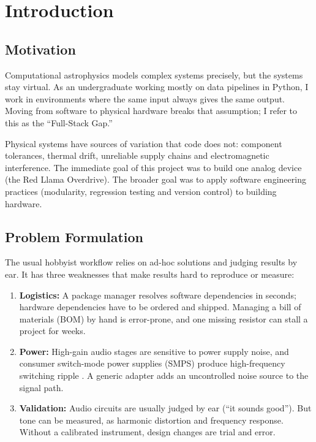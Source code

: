 \documentclass[11pt, a4paper]{report}
\begin{document}
\chapter{Introduction}

\section{Motivation}
Computational astrophysics models complex systems precisely, but the systems stay virtual. As an undergraduate working mostly on data pipelines in Python, I work in environments where the same input always gives the same output. Moving from software to physical hardware breaks that assumption; I refer to this as the ``Full-Stack Gap.''

Physical systems have sources of variation that code does not: component tolerances, thermal drift, unreliable supply chains and electromagnetic interference. The immediate goal of this project was to build one analog device (the Red Llama Overdrive). The broader goal was to apply software engineering practices (modularity, regression testing and version control) to building hardware.

\section{Problem Formulation}
The usual hobbyist workflow relies on ad-hoc solutions and judging results by ear. It has three weaknesses that make results hard to reproduce or measure:

\begin{enumerate}
  \item \textbf{Logistics:} A package manager resolves software dependencies in seconds; hardware dependencies have to be ordered and shipped. Managing a bill of materials (BOM) by hand is error-prone, and one missing resistor can stall a project for weeks.

  \item \textbf{Power:} High-gain audio stages are sensitive to power supply noise, and consumer switch-mode power supplies (SMPS) produce high-frequency switching ripple \cite{ti_an1950_lownoise_smps}. A generic adapter adds an uncontrolled noise source to the signal path.

  \item \textbf{Validation:} Audio circuits are usually judged by ear (``it sounds good''). But tone can be measured, as harmonic distortion and frequency response. Without a calibrated instrument, design changes are trial and error.
\end{enumerate}
\end{document}
